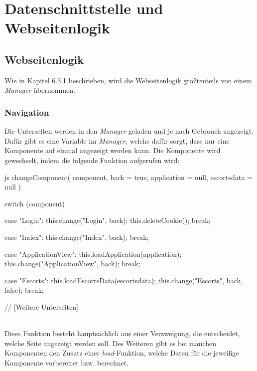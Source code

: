 \section{Datenschnittstelle und Webseitenlogik}
\subsection{Webseitenlogik}
Wie in Kapitel \hyperref[sec:webseitenlogik]{6.3.1} beschrieben, wird die Webseitenlogik größtenteils von einem \textit{Manager} übernommen.

\subsubsection{Navigation}
\label{sec:navigation}
Die Unterseiten werden in den \textit{Manager} geladen und je nach Gebrauch angezeigt. Dafür gibt es eine Variable im \textit{Manager}, welche dafür sorgt, dass nur eine Komponente auf einmal angezeigt werden kann. Die Komponente wird gewechselt, indem die folgende Funktion aufgerufen wird:
\begin{code}{js}
	changeComponent(
	component,
	back = true,
	application = null,
	escortsdata = null
	) {
		switch (component) {
			case "Login":
			this.change("Login", back);
			this.deleteCookie();
			break;
			
			case "Index":
			this.change("Index", back);
			break;
			
			case "ApplicationView":
			this.loadApplication(application);
			this.change("ApplicationView", back);
			break;
			
			case "Escorts":
			this.loadEscortsData(escortsdata);
			this.change("Escorts", back, false);
			break;
			
			// [Weitere Unterseiten]
		}
	}
\end{code}
~\\
\newpage
Diese Funktion besteht hauptsächlich aus einer Verzweigung, die entscheidet, welche Seite angezeigt werden soll.
Des Weiteren gibt es bei manchen Komponenten den Zusatz einer \textit{load}-Funktion, welche Daten für die jeweilige Komponente vorbereitet bzw. berechnet.

